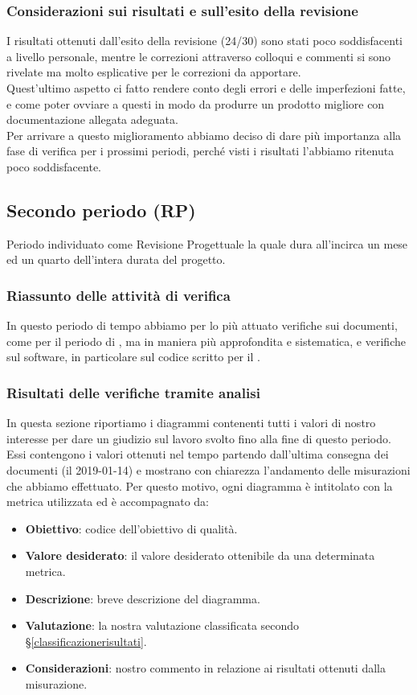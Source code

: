 	\subsubsection{Considerazioni sui risultati e sull'esito della revisione}    
    I risultati ottenuti dall'esito della revisione (24/30) sono stati poco soddisfacenti a livello personale, mentre le correzioni attraverso colloqui e commenti si sono rivelate ma molto esplicative per le correzioni da apportare.\\
    Quest'ultimo aspetto ci fatto rendere conto degli errori e delle imperfezioni fatte, e come poter ovviare a questi in modo da produrre un prodotto migliore con documentazione allegata adeguata.\\
    Per arrivare a questo miglioramento abbiamo deciso di dare più importanza alla fase di verifica per i prossimi periodi, perché visti i risultati l'abbiamo ritenuta poco soddisfacente.

	\subsection{Secondo periodo (RP)}
	Periodo individuato come Revisione Progettuale la quale dura all'incirca un mese ed un quarto dell'intera durata del progetto.

	\subsubsection{Riassunto delle attività di verifica}
	In questo periodo di tempo abbiamo per lo più attuato verifiche sui documenti, come per il periodo di \RR, ma in maniera più approfondita e  sistematica, e verifiche sul software, in particolare sul codice scritto per il .


	\subsubsection{Risultati delle verifiche tramite analisi}
	In questa sezione riportiamo i diagrammi contenenti tutti i valori di nostro interesse per dare un giudizio sul lavoro svolto fino alla fine di questo periodo.
	Essi contengono i valori ottenuti nel tempo partendo dall'ultima consegna dei documenti (il 2019-01-14) e mostrano con chiarezza l'andamento delle misurazioni che abbiamo effettuato.
	Per questo motivo, ogni diagramma è intitolato con la metrica utilizzata ed è accompagnato da:
	\begin{itemize}
		\item \textbf{Obiettivo}: codice dell'obiettivo di qualità.
		\item \textbf{Valore desiderato}: il valore desiderato ottenibile da una determinata metrica.
		\item \textbf{Descrizione}: breve descrizione del diagramma.
		\item \textbf{Valutazione}: la nostra valutazione classificata secondo \S\ref{classificazionerisultati}.
		\item \textbf{Considerazioni}: nostro commento in relazione ai risultati ottenuti dalla misurazione.
	\end{itemize}


